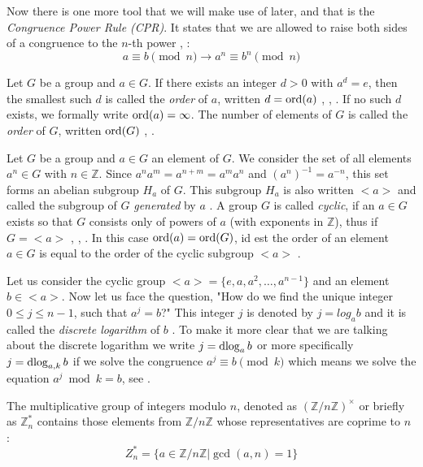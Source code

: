 Now there is one more tool that we will make use of later, and that is the \textit{Congruence Power Rule (CPR)}. It states that we are allowed to raise both sides of a congruence to the $n$-th power \cite[p.~19]{Ref_Mueller-Stach_2011}, \cite[p.~117]{Ref_Benjamin_2009}:
\begin{equation}
\label{eq:congruence_power_rule}
a\equiv b\pmod n\rightarrow a^n\equiv b^n\pmod n
\end{equation}

Let $G$ be a group and $a\in G$. If there exists an integer $d>0$ with $a^d=e$, then the smallest such $d$ is called the \textit{order} of $a$, written $d=\operatorname{ord}(a)$ \cite[p.~35]{Ref_Wolfart_2011}, \cite[p.~50]{Ref_Forster_2015}, \cite[p.~240]{Ref_Modler_Kreh_2012}. If no such $d$ exists, we formally write $\operatorname{ord}(a)=\infty$. The number of elements of $G$ is called the \textit{order} of $G$, written $\operatorname{ord}(G)$ \cite[p.~26]{Ref_Wolfart_2011}, \cite[p.~50]{Ref_Forster_2015}.

Let $G$ be a group and $a\in G$ an element of $G$. We consider the set of all elements $a^n\in G$ with $n\in\mathbb{Z}$. Since $a^na^m=a^{n+m}=a^ma^n$ and $(a^n)^{-1}=a^{-n}$, this set forms an abelian subgroup $H_a$ of $G$. This subgroup $H_a$ is also written $<a>$ and called the subgroup of $G$ \textit{generated} by $a$ \cite[p.~50]{Ref_Forster_2015}. A group $G$ is called \textit{cyclic}, if an $a\in G$ exists so that $G$ consists only of powers of $a$ (with exponents in $\mathbb{Z}$), thus if $G=<a>$ \cite[p.~34]{Ref_Wolfart_2011}, \cite[p.~50]{Ref_Forster_2015}, \cite[p.~240]{Ref_Modler_Kreh_2012}. In this case $\operatorname{ord}(a)=\operatorname{ord}(G)$, id est the order of an element $a\in G$ is equal to the order of the cyclic subgroup $<a>$ \cite[p.~50]{Ref_Forster_2015}.

Let us consider the cyclic group $<a>=\{e,a,a^2,\ldots,a^{n-1}\}$ and an element $b\in<a>$. Now let us face the question, "How do we find the unique integer $0\le j\le n-1$, such that $a^j=b$?" This integer $j$ is denoted by $j=log_ab$ and it is called the \textit{discrete logarithm} of $b$ \cite[p.~255-256]{Ref_Stinson_Paterson_2019}. To make it more clear that we are talking about the discrete logarithm we write $j=\operatorname{dlog}_ab$ or more specifically $j=\operatorname{dlog}_{a,k}b$ if we solve the congruence $a^j\equiv b\pmod k$ which means we solve the equation $a^j\bmod k=b$, see \cite{Ref_Jain_2011}.

The multiplicative group of integers modulo $n$, denoted as $(\mathbb{Z}/n\mathbb{Z})^\times$ or briefly as $\mathbb{Z}_n^\ast$ contains those elements from $\mathbb{Z}/n\mathbb{Z}$ whose representatives are coprime to $n$ \cite[p.~87]{Ref_Teschl_2013}:
\begin{equation}
\label{eq:multiplicative_group_mod_n}
Z_n^\ast=\{a\in\mathbb{Z}/n\mathbb{Z}|\gcd(a,n)=1\}
\end{equation}

